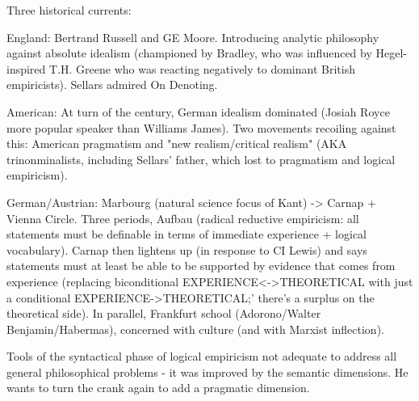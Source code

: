 
Three historical currents:

England: Bertrand Russell and GE Moore. Introducing analytic philosophy against absolute idealism (championed by Bradley, who was influenced by Hegel-inspired T.H. Greene who was reacting negatively to dominant British empiricists). Sellars admired On Denoting.

American: At turn of the century, German idealism dominated (Josiah Royce more popular speaker than Williams James). Two movements recoiling against this: American pragmatism and "new realism/critical realism" (AKA trinonminalists, including Sellars' father, which lost to pragmatism and logical empiricism).

German/Austrian: Marbourg (natural science focus of Kant) -> Carnap + Vienna Circle. Three periods, Aufbau (radical reductive empiricism: all statements must be definable in terms of immediate experience + logical vocabulary). Carnap then lightens up (in response to CI Lewis) and says statements must at least be able to be supported by evidence that comes from experience (replacing biconditional EXPERIENCE<->THEORETICAL with just a conditional EXPERIENCE->THEORETICAL;' there's a surplus on the theoretical side).
In parallel, Frankfurt school (Adorono/Walter Benjamin/Habermas), concerned with culture (and with Marxist inflection).

Tools of the syntactical phase of logical empiricism not adequate to address all general philosophical problems - it was improved by the semantic dimensions. He wants to turn the crank again to add a pragmatic dimension.

